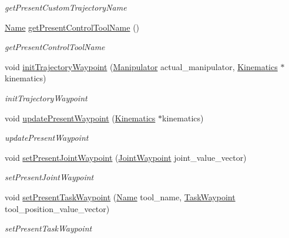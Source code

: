 \begin{DoxyCompactItemize}
\begin{DoxyCompactList}\small\item\em get\+Present\+Custom\+Trajectory\+Name \end{DoxyCompactList}\item 
\hyperlink{namespacerobotis__manipulator_a08c2d25e77a01ad75b9bb740f8ce4765}{Name} \hyperlink{classrobotis__manipulator_1_1_trajectory_a49ba36b57306d92db3214fdf21db75e5}{get\+Present\+Control\+Tool\+Name} ()
\begin{DoxyCompactList}\small\item\em get\+Present\+Control\+Tool\+Name \end{DoxyCompactList}\item 
void \hyperlink{classrobotis__manipulator_1_1_trajectory_addb10c2af208b5e1040a60b7bbf81952}{init\+Trajectory\+Waypoint} (\hyperlink{classrobotis__manipulator_1_1_manipulator}{Manipulator} actual\+\_\+manipulator, \hyperlink{classrobotis__manipulator_1_1_kinematics}{Kinematics} $\ast$kinematics)
\begin{DoxyCompactList}\small\item\em init\+Trajectory\+Waypoint \end{DoxyCompactList}\item 
void \hyperlink{classrobotis__manipulator_1_1_trajectory_a05e95f1473723592130f63321664fb0c}{update\+Present\+Waypoint} (\hyperlink{classrobotis__manipulator_1_1_kinematics}{Kinematics} $\ast$kinematics)
\begin{DoxyCompactList}\small\item\em update\+Present\+Waypoint \end{DoxyCompactList}\item 
void \hyperlink{classrobotis__manipulator_1_1_trajectory_a58b1d4fb60f7e3ed9150d312766debc1}{set\+Present\+Joint\+Waypoint} (\hyperlink{namespacerobotis__manipulator_a4456fd8b14e1f6b7733a77837dfe9339}{Joint\+Waypoint} joint\+\_\+value\+\_\+vector)
\begin{DoxyCompactList}\small\item\em set\+Present\+Joint\+Waypoint \end{DoxyCompactList}\item 
void \hyperlink{classrobotis__manipulator_1_1_trajectory_a043c122ac281c223eb73303255981d17}{set\+Present\+Task\+Waypoint} (\hyperlink{namespacerobotis__manipulator_a08c2d25e77a01ad75b9bb740f8ce4765}{Name} tool\+\_\+name, \hyperlink{namespacerobotis__manipulator_a440e2d88ec85fdee394e540dc6024c3e}{Task\+Waypoint} tool\+\_\+position\+\_\+value\+\_\+vector)
\begin{DoxyCompactList}\small\item\em set\+Present\+Task\+Waypoint \end{DoxyCompactList}\item 

\end{DoxyCompactItemize}
